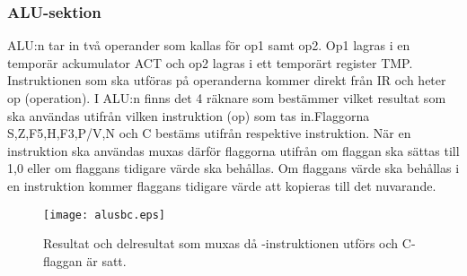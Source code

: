 \documentclass[main.tex]{subfiles}
\begin{document}
\newpage
\subsubsection{ALU-sektion}
ALU:n tar in två operander som kallas för op1 samt op2. Op1 lagras i en
temporär ackumulator ACT och op2 lagras i ett temporärt register TMP.
Instruktionen som ska utföras på operanderna kommer direkt från IR och heter op
(operation). I ALU:n finns det 4 räknare som bestämmer vilket resultat som ska
användas utifrån vilken instruktion (op) som tas in.Flaggorna S,Z,F5,H,F3,P/V,N
och C bestäms utifrån respektive instruktion. När en instruktion ska användas
muxas därför flaggorna utifrån om flaggan ska sättas till 1,0 eller om flaggans
tidigare värde ska behållas. Om flaggans värde ska behållas i en instruktion
kommer flaggans tidigare värde att kopieras till det nuvarande.

\begin{SCfigure}
    \centering
    \texttt{[image: alusbc.eps]}
    \caption{Resultat och delresultat som muxas då -instruktionen
    utförs och C-flaggan är satt.}
\end{SCfigure}
\end{document}
